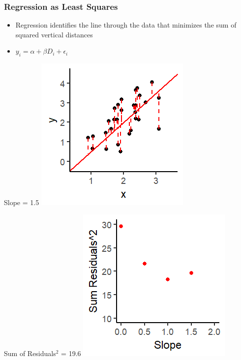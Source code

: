 \documentclass[xcolor=x11names,compress]{beamer}\usepackage[]{graphicx}\usepackage[]{color}
\makeatletter
\def\maxwidth{ %
  \ifdim\Gin@nat@width>\linewidth
    \linewidth
  \else
    \Gin@nat@width
  \fi
}
\newenvironment{knitrout}{}{} %
\renewcommand{\(}{\begin{columns}}
\renewcommand{\)}{\end{columns}}
\newcommand{\<}[1]{\begin{column}{#1}}
\renewcommand{\>}{\end{column}}
\makeatother
\begin{document}
\begin{frame}
\frametitle{Regression as Least Squares}
\begin{itemize}
\item Regression identifies the line through the data that minimizes the sum of squared vertical distances 
\item $y_i = \alpha + \beta D_i + \epsilon_i$
\end{itemize}
\begin{multicols}{2}
Slope = 1.5
\begin{knitrout}
\color{fgcolor}
\includegraphics[width=\maxwidth]{figure/graph_ols4-1} 

\end{knitrout}
\columnbreak
Sum of Residuals$^2$ = 19.6
\begin{knitrout}
\color{fgcolor}
\includegraphics[width=\maxwidth]{figure/graph_ssr4-1} 

\end{knitrout}
\end{multicols}
\end{frame}
\end{document}
